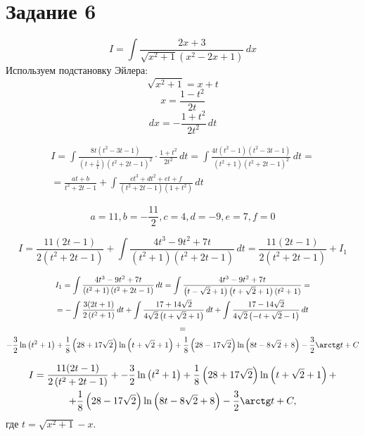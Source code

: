 \section{Задание 6}
\[ I = \int \frac{2 x+3}{\sqrt{x^2+1} \left(x^2-2 x+1\right)} \, dx \]
Используем подстановку Эйлера:
\[ \sqrt{x^2+1} = x + t \]
\[ x = \frac{1-t^2}{2t} \]
\[ dx = -\frac{1+t^2}{2t^2} \, dt \]

\begin{multline*}
    I = \int  \frac{8 t \left(t^2-3 t-1\right)}
    {\left(t+\frac{1}{t}\right) \left(t^2+2 t-1\right)^2} \cdot
    \frac{1 + t^2}{2t^2} \, dt = 
    \int \frac{4 t \left(t^2-1\right) \left(t^2-3 t-1\right)}{\left(t^2+1\right)
    \left(t^2+2 t-1\right)^2} \, dt = \\ = \frac{at + b}{t^2+2t-1} + 
    \int \frac{ct^3 + dt^2 + et+f}{(t^2+2t-1)(1+t^2)} \, dt
\end{multline*}

\[ a = 11, b = -\frac{11}{2},c = 4,d= -9,e= 7,f= 0\]

\[
    I = \frac{11 (2 t-1)}{2 \left(t^2+2 t-1\right)} + \int \frac{4 t^3-9 t^2+7
    t}{\left(t^2+1\right) \left(t^2+2 t-1\right)} \, dt =
    \frac{11 (2 t-1)}{2 \left(t^2+2 t-1\right)} + I_1
\]

\begin{multline*}
    I_1 = \int \frac{4 t^3-9 t^2+7 t}{\left(t^2+1\right) \left(t^2+2 t-1\right)}
    \, dt = \int \frac{4t^3-9t^2+7t}{\left(t-\sqrt{2}+1\right)
    \left(t+\sqrt{2}+1\right)(t^2+1)} = \\
    = -\int \frac{3 (2 t+1)}{2 \left(t^2+1\right)} \, dt + \int \frac{17+14 \sqrt{2}}{4 \sqrt{2}
    \left(t+\sqrt{2}+1\right)} \, dt + \int \frac{17-14 \sqrt{2}}{4 \sqrt{2}
    \left(-t+\sqrt{2}-1\right)} \, dt \\ = \\ -\frac{3}{2} \ln
    \left(t^2+1\right)+\frac{1}{8} \left(28+17 \sqrt{2}\right) \ln
    \left(t+\sqrt{2}+1\right)+\frac{1}{8} \left(28-17 \sqrt{2}\right) \ln
    \left(8 t-8 \sqrt{2}+8\right)-\frac{3}{2}  \arctg t + C
\end{multline*}

\begin{multline*}
    I = \frac{11 (2 t-1)}{2 \left(t^2+2 t-1\right)} + -\frac{3}{2} \ln
    \left(t^2+1\right)+\frac{1}{8} \left(28+17 \sqrt{2}\right) \ln
    \left(t+\sqrt{2}+1\right)+ \\ +\frac{1}{8} \left(28-17 \sqrt{2}\right) \ln
\left(8 t-8 \sqrt{2}+8\right)-\frac{3}{2}  \arctg t + C,
\end{multline*}
где $ t = \sqrt{x^2+1} - x $.

